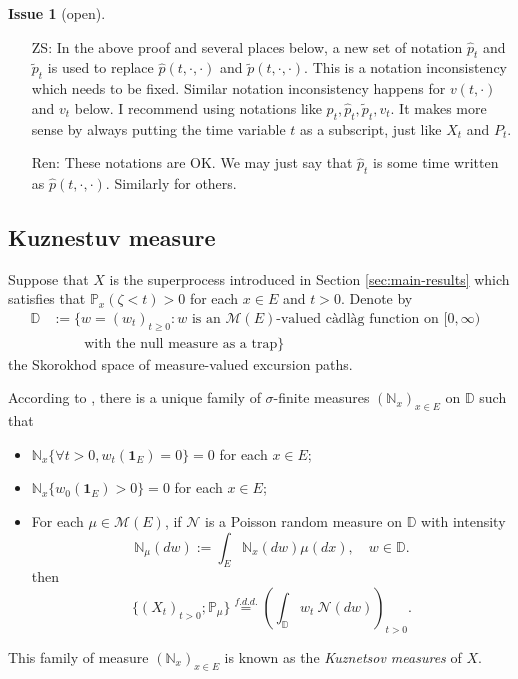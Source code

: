 \documentclass[12pt,a4paper]{amsart}
\numberwithin{equation}{section}
\theoremstyle{plain}
\theoremstyle{definition}
\newtheorem{iss}{Issue}
\begin{document}
\begin{iss}[open]~
\label{iss:notation_for_pt}
  \begin{itemize}
  \item[ZS:]
    In the above proof and several places below, a new set of notation $\widehat p_t$ and $\widetilde p_t$ is used to replace $\widehat p(t,\cdot,\cdot)$ and $\widetilde p(t,\cdot, \cdot)$. This is a notation inconsistency which needs to be fixed. Similar notation inconsistency happens for $v(t,\cdot)$ and $v_t$ below. I recommend using notations like $p_t, \widehat p_t,\widetilde p_t, v_t$. It makes more sense by always putting the time variable $t$ as a subscript, just like $X_t$ and $P_t$.
    
   \item[Ren:] 
These notations are OK. We may just say that $\widehat p_t$ is some time written as $\widehat p(t,\cdot,\cdot)$. Similarly for others.
  \end{itemize}
\end{iss}

\subsection{Kuznestuv measure}
Suppose that $X$ is the superprocess introduced in Section \ref{sec:main-results} which satisfies that $\mathbb P_{x}(\zeta < t)>0$ for each $x\in E$ and $t>0$. Denote by
\begin{align}
	\mathbb D &:=\{ w= (w_t)_{t\geq 0}: w \text{ is an $\mathcal M(E)$-valued c\`{a}dl\`{a}g function on $[0,\infty)$ }
	\\ &\qquad \text{ with the null measure as a trap} \}
\end{align}
the Skorokhod space of measure-valued excursion paths.

According to \cite[Section 8.4]{Li2011Measurevalued}, there is a unique family of $\sigma$-finite measures $(\mathbb N_x)_{x\in E}$ on $\mathbb D$ such that
\begin{itemize}
\item
  $\mathbb N_x \{\forall t > 0, w_t(\mathbf 1_E)=0\} =0$ for each $x\in E$;
\item
  $\mathbb N_x \{ w_0(\mathbf 1_E) > 0\} = 0$ for each $x\in E$;
\item
  For each $\mu \in \mathcal M(E)$, if $\mathcal N$ is a Poisson random measure on $\mathbb D$ with intensity
  \[
    \mathbb N_\mu(dw):= \int_E \mathbb N_x(dw)\mu(dx), \quad w\in \mathbb D.
  \]
	then
  \[
    \{(X_t)_{t> 0};\mathbb P_\mu\}
    \overset{f.d.d.}{=} \left(\int_{\mathbb D} w_t~\mathcal N(dw)\right)_{t> 0}.
  \]
\end{itemize}
This family of measure $(\mathbb N_x)_{x\in E}$ is known as the \emph{Kuznetsov measures} of $X$.
\end{document}
